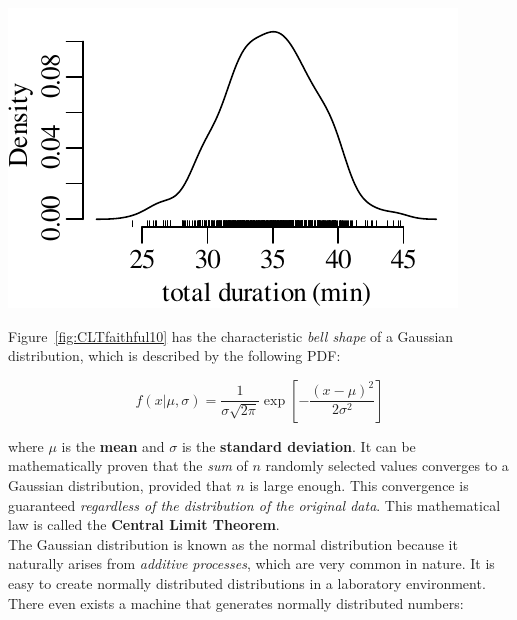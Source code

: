 \noindent\begin{minipage}[t][][b]{.35\textwidth}
  \includegraphics[width=\textwidth]{../figures/CLTfaithful10.pdf}\\
\end{minipage}
\begin{minipage}[t][][t]{.65\textwidth}
  \label{fig:CLTfaithful10}
\end{minipage}

Figure~\ref{fig:CLTfaithful10} has the characteristic \emph{bell
  shape} of a Gaussian distribution, which is described by the
following PDF:

\begin{equation}
  f(x|\mu,\sigma) = \frac{1}{\sigma\sqrt{2\pi}}
  \exp\!\left[-\frac{(x-\mu)^2}{2\sigma^2}\right]
  \label{eq:gauss}
\end{equation}

\noindent where $\mu$ is the \textbf{mean} and $\sigma$ is the
\textbf{standard deviation}. It can be mathematically proven that the
\emph{sum} of $n$ randomly selected values converges to a Gaussian
distribution, provided that $n$ is large enough. This convergence is
guaranteed \textit{regardless of the distribution of the original
  data}.  This mathematical law is called the \textbf{Central Limit
  Theorem}.\\

The Gaussian distribution is known as the normal distribution because
it naturally arises from \emph{additive processes}, which are very
common in nature. It is easy to create normally distributed
distributions in a laboratory environment. There even exists a machine
that generates normally distributed numbers:

